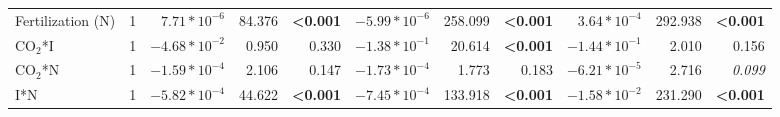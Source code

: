\begin{landscape}
\begin{table}
{\begin{tabular}{p{3.5cm}p{0.5cm}p{1.75cm}p{1.5cm}p{1.5cm}p{1.75cm}p{1.5cm}p{1.5cm}p{1.75cm}p{1.5cm}p{1.5cm}}
            Fertilization (N) & \multicolumn{1}{r}{1}
            & \multicolumn{1}{r}{$7.71*10^{-6}$}      & \multicolumn{1}{r}{84.376}        & \multicolumn{1}{r}{\textbf{<0.001}}
            & \multicolumn{1}{r}{$-5.99*10^{-6}$}     & \multicolumn{1}{r}{258.099}       & \multicolumn{1}{r}{\textbf{<0.001}}
            & \multicolumn{1}{r}{$3.64*10^{-4}$}      & \multicolumn{1}{r}{292.938}       & \multicolumn{1}{r}{\textbf{<0.001}} 
            \\

            CO$_2$*I & \multicolumn{1}{r}{1}
            & \multicolumn{1}{r}{$-4.68*10^{-2}$}     & \multicolumn{1}{r}{0.950}         & \multicolumn{1}{r}{0.330}
            & \multicolumn{1}{r}{$-1.38*10^{-1}$}     & \multicolumn{1}{r}{20.614}        & \multicolumn{1}{r}{\textbf{<0.001}}
            & \multicolumn{1}{r}{$-1.44*10^{-1}$}     & \multicolumn{1}{r}{2.010}         & \multicolumn{1}{r}{0.156} 
            \\

            CO$_2$*N & \multicolumn{1}{r}{1}
            & \multicolumn{1}{r}{$-1.59*10^{-4}$}     & \multicolumn{1}{r}{2.106}         & \multicolumn{1}{r}{0.147}
            & \multicolumn{1}{r}{$-1.73*10^{-4}$}     & \multicolumn{1}{r}{1.773}         & \multicolumn{1}{r}{0.183}
            & \multicolumn{1}{r}{$-6.21*10^{-5}$}     & \multicolumn{1}{r}{2.716}         & \multicolumn{1}{r}{\textit{0.099}} 
            \\

            I*N & \multicolumn{1}{r}{1}
            & \multicolumn{1}{r}{$-5.82*10^{-4}$}     & \multicolumn{1}{r}{44.622}        & \multicolumn{1}{r}{\textbf{<0.001}}
            & \multicolumn{1}{r}{$-7.45*10^{-4}$}     & \multicolumn{1}{r}{133.918}       & \multicolumn{1}{r}{\textbf{<0.001}}
            & \multicolumn{1}{r}{$-1.58*10^{-2}$}     & \multicolumn{1}{r}{231.290}       & \multicolumn{1}{r}{\textbf{<0.001}} 
            \\


\end{tabular}}
\end{table}
\end{landscape}
